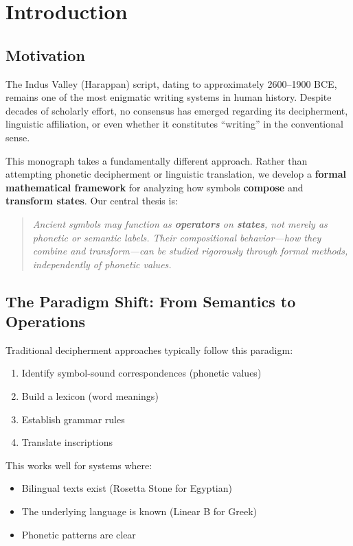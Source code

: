 \chapter{Introduction}

\section{Motivation}

The Indus Valley (Harappan) script, dating to approximately 2600--1900 BCE, remains one of the most enigmatic writing systems in human history. Despite decades of scholarly effort, no consensus has emerged regarding its decipherment, linguistic affiliation, or even whether it constitutes ``writing'' in the conventional sense.

This monograph takes a fundamentally different approach. Rather than attempting phonetic decipherment or linguistic translation, we develop a \textbf{formal mathematical framework} for analyzing how symbols \textbf{compose} and \textbf{transform states}. Our central thesis is:

\begin{quote}
\textit{Ancient symbols may function as \textbf{operators} on \textbf{states}, not merely as phonetic or semantic labels. Their compositional behavior—how they combine and transform—can be studied rigorously through formal methods, independently of phonetic values.}
\end{quote}

\section{The Paradigm Shift: From Semantics to Operations}

Traditional decipherment approaches typically follow this paradigm:

\begin{enumerate}
    \item Identify symbol-sound correspondences (phonetic values)
    \item Build a lexicon (word meanings)
    \item Establish grammar rules
    \item Translate inscriptions
\end{enumerate}

This works well for systems where:
\begin{itemize}
    \item Bilingual texts exist (Rosetta Stone for Egyptian)
    \item The underlying language is known (Linear B for Greek)
    \item Phonetic patterns are clear
\end{itemize}

